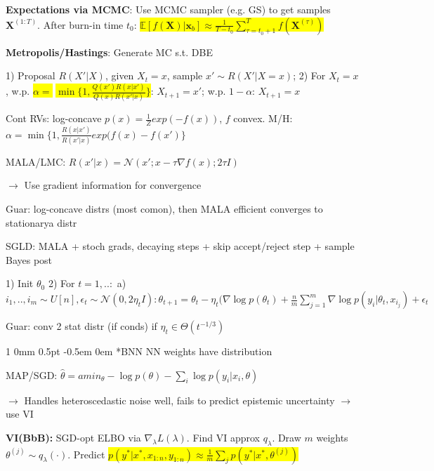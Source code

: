 \documentclass[11pt,landscape,a4paper,fleqn]{article}
\makeatletter
\newcommand*{\rsection}{%
	\@startsection{section}%
	{1}%
	{0mm}%
	{0.5pt}%
	{-0.5em \@plus 0em}
	{\color{myorange}\sffamily\small\bfseries}}
\newcommand{\mhl}[1]{\setlength{\fboxsep}{0pt}\colorbox{yellow}{#1}}
\makeatother
\begin{document}
\begin{multicols*}{4}
\vspace*{1mm}
\textbf{Expectations via MCMC}: Use MCMC sampler (e.g. GS) to get samples $\mathbf{X}^{(1:T)}$. After burn-in time $t_0$:
\mhl{$\mathbb{E}[f(\mathbf{X}) | \mathbf{x}_b] \approx \frac{1}{T - t_0} \sum_{\tau = t_0 + 1}^{T} f(\mathbf{X}^{(\tau)})$}


\textbf{Metropolis/Hastings}: Generate MC s.t. DBE

1) Proposal $R(X' | X)$, given $X_t = x$, sample $x' \sim R(X' | X=x)$; 2) For $X_t = x$, w.p. \mhl{$\alpha =$} \mhl{$\min \{ 1, \frac{Q(x')R(x | x')}{Q(x) R(x' | x)}\}$}: $X_{t+1} = x'$; w.p. $1 - \alpha$: $X_{t+1} = x$

Cont RVs: log-concave $p(x) = \frac{1}{Z} exp(-f(x))$, $f$ convex. M/H: $\alpha = \min \{ 1, \frac{R(x|x')}{R(x'|x)}exp(f(x) - f(x')\}$

MALA/LMC: $R(x' | x) = \mathcal{N}(x'; x - \tau \nabla f(x); 2\tau I)$

$\rightarrow$ Use gradient information for convergence

Guar: log-concave distrs (most comon), then MALA efficient converges to stationarya distr

SGLD: MALA + stoch grads, decaying steps + skip accept/reject step + sample Bayes post

1) Init $\theta_0$ 2) For $t=1,..:$ a) $i_1,..,i_m\sim U[n],\epsilon_t\sim \mathcal{N}(0,2\eta_t I): \theta_{t+1}=\theta_{t}-\eta_t(\nabla \log p(\theta_t)+\frac{n}{m}\sum^m_{j=1}\nabla\log p(y_i|\theta_t,x_{i_j})+\epsilon_t$

Guar: conv 2 stat distr (if conds) if $\eta_t\in\Theta(t^{-1/3})$

\vspace*{1mm}
\rsection*{BNN} NN weights have distribution

{\fontsize{9.5}{6}\selectfont MAP/SGD: $\hat{\theta} = amin_\theta -\log p(\theta) - \sum_{i} \log p(y_i | x_i, \theta)$}

$\rightarrow$ Handles heteroscedastic noise well, fails to predict epistemic uncertainty $\rightarrow$ use VI

\textbf{VI(BbB):} SGD-opt ELBO via $\nabla_\lambda L(\lambda)$. Find VI approx $q_\lambda$. Draw $m$ weights $\theta^{(j)} \sim q_\lambda(\cdot)$. Predict \mhl{$p(y^* | x^*, x_{1:n}, y_{1:n}) \approx \frac{1}{m} \sum_j p(y^* | x^*, \theta^{(j)})$}



\end{multicols*}
\end{document}
